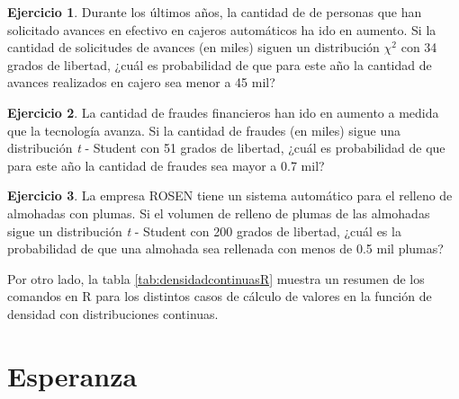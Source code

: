\documentclass[
  11pt,
]{book}
\theoremstyle{definition}
\theoremstyle{definition}
\theoremstyle{definition}
\newtheorem{exercise}{Ejercicio}[chapter]
\theoremstyle{definition}
\theoremstyle{remark}
\begin{document}
\begin{exercise}
Durante los últimos años, la cantidad de de personas que han solicitado avances en efectivo en cajeros automáticos ha ido en aumento. Si la cantidad de solicitudes de avances (en miles) siguen un distribución \(\chi^2\) con 34 grados de libertad, ¿cuál es probabilidad de que para este año la cantidad de avances realizados en cajero sea menor a 45 mil?
\end{exercise}

\begin{exercise}
La cantidad de fraudes financieros han ido en aumento a medida que la tecnología avanza. Si la cantidad de fraudes (en miles) sigue una distribución \emph{t} - Student con 51 grados de libertad, ¿cuál es probabilidad de que para este año la cantidad de fraudes sea mayor a 0.7 mil?
\end{exercise}

\begin{exercise}
La empresa ROSEN tiene un sistema automático para el relleno de almohadas con plumas. Si el volumen de relleno de plumas de las almohadas sigue un distribución \emph{t} - Student con 200 grados de libertad, ¿cuál es la probabilidad de que una almohada sea rellenada con menos de 0.5 mil plumas?
\end{exercise}

Por otro lado, la tabla \ref{tab:densidadcontinuasR} muestra un resumen de los comandos en R para los distintos casos de cálculo de valores en la función de densidad con distribuciones continuas.

\begin{table}[H]
\centering
\caption{\label{tab:densidadcontinuasR}Cálculo de densidades de distribuciones continuas en R.}
\centering
{}
\end{table}

\section{Esperanza}\label{probabilidad-esperanza}
\end{document}
